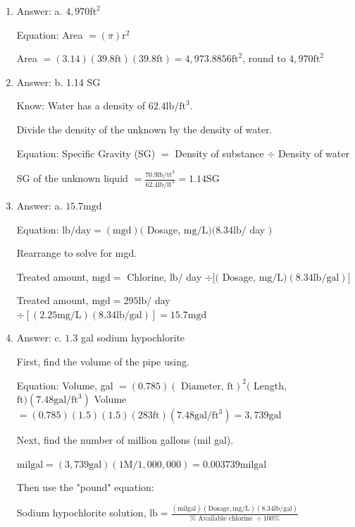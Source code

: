 \documentclass[10pt]{article}
\begin{document}
\begin{enumerate}
  \item Answer: a. $4,970 \mathrm{ft}^{2}$

Equation: Area $=(\pi) \mathrm{r}^{2}$

Area $=(3.14)(39.8 \mathrm{ft})(39.8 \mathrm{ft})=4,973.8856 \mathrm{ft}^{2}$, round to $4,970 \mathrm{ft}^{2}$

  \item Answer: b. 1.14 SG

Know: Water has a density of $62.4 \mathrm{lb} / \mathrm{ft}^{3}$.

Divide the density of the unknown by the density of water.

Equation: Specific Gravity (SG) $=$ Density of substance $\div$ Density of water

SG of the unknown liquid $=\frac{70.9 \mathrm{lb} / \mathrm{tt}^{3}}{62.4 \mathrm{lb} / \mathrm{ft}^{3}}=1.14 \mathrm{SG}$

  \item Answer: a. $15.7 \mathrm{mgd}$

Equation: $\mathrm{lb} / \mathrm{day}=(\mathrm{mgd})($ Dosage, $\mathrm{mg} / \mathrm{L})(8.34 \mathrm{lb} /$ day $)$

Rearrange to solve for mgd.

Treated amount, $\mathrm{mgd}=$ Chlorine, $\mathrm{lb} /$ day $\div[($ Dosage, $\mathrm{mg} / \mathrm{L})(8.34 \mathrm{lb} / \mathrm{gal})]$

Treated amount, $\mathrm{mgd}=295 \mathrm{lb} /$ day $\div[(2.25 \mathrm{mg} / \mathrm{L})(8.34 \mathrm{lb} / \mathrm{gal})]=15.7 \mathrm{mgd}$

  \item Answer: c. $1.3$ gal sodium hypochlorite

First, find the volume of the pipe using.

Equation: Volume, gal $=(0.785)(\text { Diameter, } \mathrm{ft})^{2}($ Length, $\mathrm{ft})\left(7.48 \mathrm{gal} / \mathrm{ft}^{3}\right)$ Volume $=(0.785)(1.5)(1.5)(283 \mathrm{ft})\left(7.48 \mathrm{gal} / \mathrm{ft}^{3}\right)=3,739 \mathrm{gal}$

Next, find the number of million gallons (mil gal).

$\mathrm{mil} \mathrm{gal}=(3,739 \mathrm{gal})(1 \mathrm{M} / 1,000,000)=0.003739 \mathrm{mil} \mathrm{gal}$

Then use the "pound" equation:

Sodium hypochlorite solution, $\mathrm{lb}=\frac{(\mathrm{mil} \mathrm{gal})(\mathrm{Dosage}, \mathrm{mg} / \mathrm{L})(8.34 \mathrm{lb} / \mathrm{gal})}{\% \text { Available chlorine } \div 100 \%}$


\end{enumerate}
\end{document}
